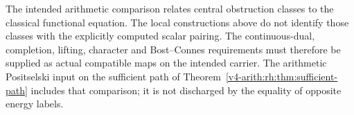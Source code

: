 The intended arithmetic comparison relates central obstruction classes
to the classical functional equation. The local constructions above do
not identify those classes with the explicitly computed scalar pairing.
The continuous-dual, completion, lifting, character and Bost--Connes
requirements must therefore be supplied as actual compatible maps on
the intended carrier. The arithmetic Positselski input on the sufficient
path of Theorem~\ref{v4-arith:rh:thm:sufficient-path} includes that comparison;
it is not discharged by the equality of opposite energy labels.
